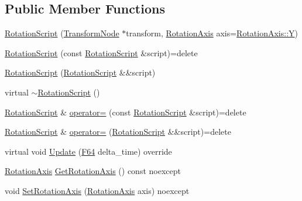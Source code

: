 \subsection*{Public Member Functions}
\begin{DoxyCompactItemize}
\item 
\hyperlink{classmage_1_1_rotation_script_a731c7c3dbe7064fe876f80307952b595}{Rotation\+Script} (\hyperlink{structmage_1_1_transform_node}{Transform\+Node} $\ast$transform, \hyperlink{classmage_1_1_rotation_script_ad06cf896ce6dfe4f6676b263d15b4ee9}{Rotation\+Axis} axis=\hyperlink{classmage_1_1_rotation_script_ad06cf896ce6dfe4f6676b263d15b4ee9a57cec4137b614c87cb4e24a3d003a3e0}{Rotation\+Axis\+::Y})
\item 
\hyperlink{classmage_1_1_rotation_script_a52ee0473609565766fc1153678ee8b60}{Rotation\+Script} (const \hyperlink{classmage_1_1_rotation_script}{Rotation\+Script} \&script)=delete
\item 
\hyperlink{classmage_1_1_rotation_script_a5c6464f8e38fde0442c3b6f49a9cbed1}{Rotation\+Script} (\hyperlink{classmage_1_1_rotation_script}{Rotation\+Script} \&\&script)
\item 
virtual \hyperlink{classmage_1_1_rotation_script_adc2af2d6ed93558fd66b569297b294d0}{$\sim$\+Rotation\+Script} ()
\item 
\hyperlink{classmage_1_1_rotation_script}{Rotation\+Script} \& \hyperlink{classmage_1_1_rotation_script_a738c666a1aa42412da82d24368b20dfe}{operator=} (const \hyperlink{classmage_1_1_rotation_script}{Rotation\+Script} \&script)=delete
\item 
\hyperlink{classmage_1_1_rotation_script}{Rotation\+Script} \& \hyperlink{classmage_1_1_rotation_script_a093aa3f50dcbbe68847bb0b5f6363e7a}{operator=} (\hyperlink{classmage_1_1_rotation_script}{Rotation\+Script} \&\&script)=delete
\item 
virtual void \hyperlink{classmage_1_1_rotation_script_a767affada9bd2fcd2187365dbfd79b5b}{Update} (\hyperlink{namespacemage_ad26233bbec640deda836e572c1a23708}{F64} delta\+\_\+time) override
\item 
\hyperlink{classmage_1_1_rotation_script_ad06cf896ce6dfe4f6676b263d15b4ee9}{Rotation\+Axis} \hyperlink{classmage_1_1_rotation_script_a6fbbbec1bd610da2c917d1ef2d05f556}{Get\+Rotation\+Axis} () const noexcept
\item 
void \hyperlink{classmage_1_1_rotation_script_a32c12db9206002a1aa2dd0e2e3b4ecd7}{Set\+Rotation\+Axis} (\hyperlink{classmage_1_1_rotation_script_ad06cf896ce6dfe4f6676b263d15b4ee9}{Rotation\+Axis} axis) noexcept
\end{DoxyCompactItemize}
